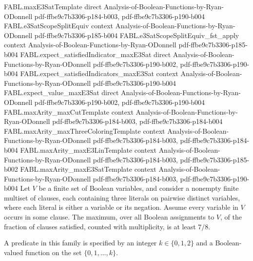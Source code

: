 \begin{theorem}
\proofstep
  {FABL.maxE3SatTemplate}
  {direct}
  {Analysis-of-Boolean-Functions-by-Ryan-ODonnell}
  {pdf-ffbe9c7b3306-p184-b003,
    pdf-ffbe9c7b3306-p190-b004}
\proofstep
  {FABL.e3SatScopeSplitEquiv}
  {context}
  {Analysis-of-Boolean-Functions-by-Ryan-ODonnell}
  {pdf-ffbe9c7b3306-p185-b004}
\proofstep
  {FABL.e3SatScopeSplitEquiv_fst_apply}
  {context}
  {Analysis-of-Boolean-Functions-by-Ryan-ODonnell}
  {pdf-ffbe9c7b3306-p185-b004}
\proofstep
  {FABL.expect_satisfiedIndicator_maxE3Sat}
  {direct}
  {Analysis-of-Boolean-Functions-by-Ryan-ODonnell}
  {pdf-ffbe9c7b3306-p190-b002,
    pdf-ffbe9c7b3306-p190-b004}
\proofstep
  {FABL.expect_satisfiedIndicators_maxE3Sat}
  {context}
  {Analysis-of-Boolean-Functions-by-Ryan-ODonnell}
  {pdf-ffbe9c7b3306-p190-b004}
\proofstep
  {FABL.expect_value_maxE3Sat}
  {direct}
  {Analysis-of-Boolean-Functions-by-Ryan-ODonnell}
  {pdf-ffbe9c7b3306-p190-b002,
    pdf-ffbe9c7b3306-p190-b004}
\proofstep
  {FABL.maxArity_maxCutTemplate}
  {context}
  {Analysis-of-Boolean-Functions-by-Ryan-ODonnell}
  {pdf-ffbe9c7b3306-p184-b003,
    pdf-ffbe9c7b3306-p184-b004}
\proofstep
  {FABL.maxArity_maxThreeColoringTemplate}
  {context}
  {Analysis-of-Boolean-Functions-by-Ryan-ODonnell}
  {pdf-ffbe9c7b3306-p184-b003,
    pdf-ffbe9c7b3306-p184-b004}
\proofstep
  {FABL.maxArity_maxE3LinTemplate}
  {context}
  {Analysis-of-Boolean-Functions-by-Ryan-ODonnell}
  {pdf-ffbe9c7b3306-p184-b003,
    pdf-ffbe9c7b3306-p185-b002}
\proofstep
  {FABL.maxArity_maxE3SatTemplate}
  {context}
  {Analysis-of-Boolean-Functions-by-Ryan-ODonnell}
  {pdf-ffbe9c7b3306-p184-b003,
    pdf-ffbe9c7b3306-p190-b004}
Let $V$ be a finite set of Boolean variables, and consider a nonempty finite multiset of
clauses, each containing three literals on pairwise distinct variables, where each
literal is either a variable or its negation. Assume every variable in $V$ occurs in
some clause. The maximum, over all Boolean assignments to $V$, of the fraction of
clauses satisfied, counted with multiplicity, is at least $7/8$.
\end{theorem}

\begin{definition}
\label{FABL.MaxThreeSatPredicate}
\leanok
A predicate in this family is specified by an integer $k\in\{0,1,2\}$ and a
Boolean-valued function on the set $\{0,1,\ldots,k\}$.
\end{definition}

